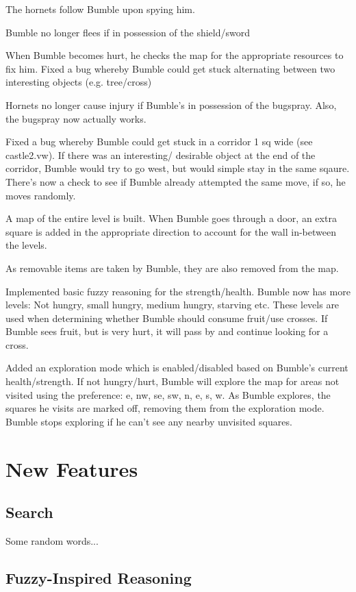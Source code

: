 \documentclass[a4paper,oneside]{report}
\begin{document}
The hornets follow Bumble upon spying him.

Bumble no longer flees if in possession of the shield/sword

When Bumble becomes hurt, he checks the map for the appropriate resources to fix him.
Fixed a bug whereby Bumble could get stuck alternating between two interesting objects (e.g. tree/cross)

Hornets no longer cause injury if Bumble's in possession of the bugspray. Also, the bugspray now actually works.

Fixed a bug whereby Bumble could get stuck in a corridor 1 sq wide (see castle2.vw). 
If there was an interesting/ desirable object at the end of the corridor, Bumble would try to go west, but would simple stay in the same sqaure. There's now a check to see if Bumble already attempted the same move, if so, he moves randomly.

A map of the entire level is built. When Bumble goes through a door, an extra square is added in the appropriate direction to account for the wall in-between the levels. 

As removable items are taken by Bumble, they are also removed from the map.

Implemented basic fuzzy reasoning for the strength/health. Bumble now has more levels: 
Not hungry, small hungry, medium hungry, starving etc. These levels are used when determining whether Bumble should consume fruit/use crosses. If Bumble sees fruit, but is very hurt, it will pass by and continue looking for a cross.

Added an exploration mode which is enabled/disabled based on Bumble's current health/strength. If not hungry/hurt, Bumble will explore the map for areas not visited using the preference: e, nw, se, sw, n, e, s, w. As Bumble explores, the squares he visits are marked off, removing them from the exploration mode. Bumble stops exploring if he can't see any nearby unvisited squares.

\section{New Features}

\subsection{Search}

Some random words...

\subsection{Fuzzy-Inspired Reasoning}
	
\end{document}
